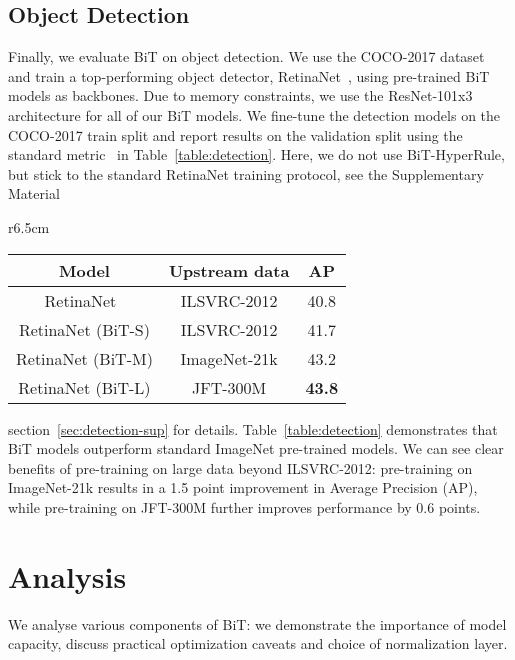 \documentclass[runningheads]{llncs}
\newcommand{\name}{{BiT}}
\newcommand{\hyper}{{BiT-HyperRule}}
\begin{document}
\subsection{Object Detection}

Finally, we evaluate \name{} on object detection.
We use the COCO-2017 dataset~\cite{lin2014microsoft} and train a top-performing object detector, RetinaNet~\cite{lin2017focal}, using pre-trained \name{} models as backbones.
Due to memory constraints, we use the ResNet-101x3 architecture for all of our BiT models.
We fine-tune the detection models on the COCO-2017 train split and report results on the validation split using the standard metric~\cite{lin2014microsoft} in Table~\ref{table:detection}.
Here, we do not use \hyper{}, but stick to the standard RetinaNet training protocol, see the Supplementary Material
\begin{wraptable}{r}{6.5cm}\vspace{-13pt}
\begin{tabular}{|c|c|c|}
  \hline
  \bf Model & \bf Upstream data & \bf AP \\
  \hline
  RetinaNet~\cite{lin2017focal} & ILSVRC-2012 & 40.8 \\
  \hline
  RetinaNet (BiT-S) & ILSVRC-2012 & 41.7 \\
  RetinaNet (BiT-M) & ImageNet-21k & 43.2 \\
  RetinaNet (BiT-L) &  JFT-300M  & \bf43.8 \\
  \hline
\end{tabular}
\caption{Object detection performance on COCO-2017~\cite{lin2014microsoft} validation data of RetinaNet models with pre-trained BiT backbones and the literature baseline.}\label{table:detection}\vspace{-10pt}
\end{wraptable}
section~\ref{sec:detection-sup} for details.
Table~\ref{table:detection} demonstrates that BiT models outperform standard ImageNet pre-trained models.
We can see clear benefits of pre-training on large data beyond ILSVRC-2012: pre-training on ImageNet-21k results in a 1.5 point improvement in Average Precision (AP), while pre-training on JFT-300M further improves performance by 0.6 points.


\section{Analysis}
\label{sec:detailed_analysis}

We analyse various components of \name{}: we demonstrate the importance of model capacity, discuss practical optimization caveats and choice of normalization layer.
\end{document}
